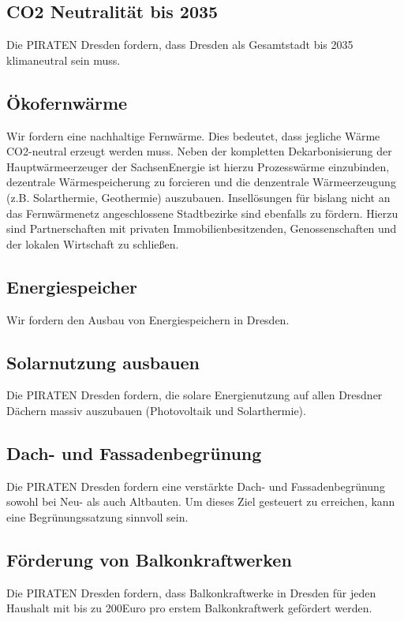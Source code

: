 \documentclass[a4paper, 11pt]{article}
\begin{document}
\subsection{CO2 Neutralität bis 2035}
Die PIRATEN Dresden fordern, dass Dresden als Gesamtstadt bis 2035 klimaneutral sein muss.


\subsection{Ökofernwärme}
Wir fordern eine nachhaltige Fernwärme. Dies bedeutet, dass jegliche Wärme CO2-neutral erzeugt werden muss. Neben der kompletten Dekarbonisierung der Hauptwärmeerzeuger der SachsenEnergie ist hierzu Prozesswärme einzubinden, dezentrale Wärmespeicherung zu forcieren und die denzentrale Wärmeerzeugung (z.B. Solarthermie, Geothermie) auszubauen. Insellösungen für bislang nicht an das Fernwärmenetz angeschlossene Stadtbezirke sind ebenfalls zu fördern. Hierzu sind Partnerschaften mit privaten Immobilienbesitzenden, Genossenschaften und der lokalen Wirtschaft zu schließen.



\subsection{Energiespeicher}
Wir fordern den Ausbau von Energiespeichern in Dresden.


\subsection{Solarnutzung ausbauen}
Die PIRATEN Dresden fordern, die solare Energienutzung auf allen Dresdner Dächern massiv auszubauen (Photovoltaik und Solarthermie).


\subsection{Dach- und Fassadenbegrünung}
Die PIRATEN Dresden fordern eine verstärkte Dach- und Fassadenbegrünung sowohl bei Neu- als auch Altbauten. Um dieses Ziel gesteuert zu erreichen, kann eine Begrünungssatzung sinnvoll sein.


\subsection{Förderung von Balkonkraftwerken}
Die PIRATEN Dresden fordern, dass Balkonkraftwerke in Dresden für jeden Haushalt mit bis zu 200Euro pro erstem Balkonkraftwerk gefördert werden.
\end{document}
